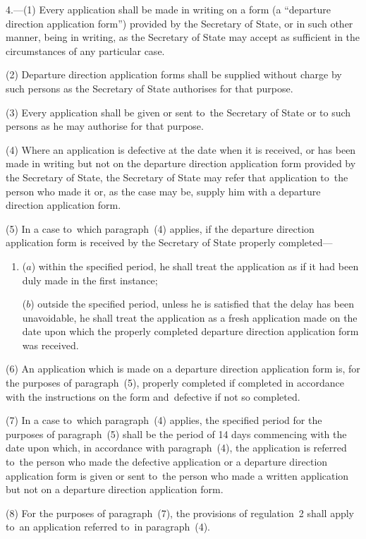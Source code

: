 \documentclass[12pt,a4paper]{article}
\begin{document}
4.—(1) Every application shall
be made in writing on a form (a “departure direction application form”) provided
by the Secretary of State, or in such other manner, being in writing, as the
Secretary of State may accept as sufficient in the circumstances of any
particular case.

(2) Departure direction application forms shall be supplied without charge by
such persons as the Secretary of State authorises for that purpose.

(3) Every application shall be given or sent to~the Secretary of State or to
such persons as he may authorise for that purpose.

(4) Where an application is defective at the date when it is received, or has
been made in writing but not on the departure direction application form
provided by the Secretary of State, the Secretary of State may refer that
application to~the person who made it or, as the case may be, supply him with a
departure direction application form.

(5) In a case to~which paragraph~(4) applies, if the departure direction
application form is received by the Secretary of State properly completed—
\begin{enumerate}\item[]
($a$) within the specified period, he shall treat the application as if it had been
duly made in the first instance;

($b$) outside the specified period, unless he is satisfied that the delay has been
unavoidable, he shall treat the application as a fresh application made on the
date upon which the properly completed departure direction application form was
received.
\end{enumerate}

(6) An application which is made on a departure direction application form is,
for the purposes of paragraph~(5), properly completed if completed in accordance
with the instructions on the form and~defective if not so completed.

(7) In a case to~which paragraph~(4) applies, the specified period for the
purposes of paragraph~(5) shall be the period of 14 days commencing with the
date upon which, in accordance with paragraph~(4), the application is referred
to~the person who made the defective application or a departure direction
application form is given or sent to~the person who made a written application
but not on a departure direction application form.

(8) For the purposes of paragraph~(7), the provisions of regulation~2 shall
apply to~an application referred to~in paragraph~(4).
\end{document}
